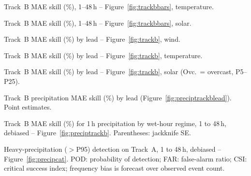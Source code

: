 \documentclass{article}
\newcommand{\numtable}[1]{%
  {\small\setlength{\tabcolsep}{6pt}\renewcommand{\arraystretch}{1.2}#1}%
}
\begin{document}
\begin{table}[htbp]
\centering
\caption{Track~B MAE skill (\%), 1--48\,h -- Figure~\ref{fig:trackbbars},
temperature.}
\label{tab:trackbtemp}
\numtable{}
\end{table}

\begin{table}[htbp]
\centering
\caption{Track~B MAE skill (\%), 1--48\,h -- Figure~\ref{fig:trackbbars},
solar.}
\label{tab:trackbsolar}
\numtable{}
\end{table}

\begin{table}[htbp]
\centering
\caption{Track~B MAE skill (\%) by lead -- Figure~\ref{fig:trackb}, wind.}
\label{tab:trackbleadwind}
\numtable{}
\end{table}

\begin{table}[htbp]
\centering
\caption{Track~B MAE skill (\%) by lead -- Figure~\ref{fig:trackb},
temperature.}
\label{tab:trackbleadtemp}
\numtable{}
\end{table}

\begin{table}[htbp]
\centering
\caption{Track~B MAE skill (\%) by lead -- Figure~\ref{fig:trackb}, solar
(Ovc.\ = overcast, P5--P25).}
\label{tab:trackbleadsolar}
\numtable{}
\end{table}

\begin{table}[htbp]
\centering
\caption{Track~B precipitation MAE skill (\%) by lead
(Figure~\ref{fig:preciptrackblead}). Point estimates.}
\label{tab:preciptrackblead}
\numtable{}
\end{table}

\begin{table}[htbp]
\centering
\caption{Track~B MAE skill (\%) for 1\,h precipitation by wet-hour regime,
1 to 48\,h, debiased -- Figure~\ref{fig:preciptrackb}. Parentheses:
jackknife SE.}
\label{tab:preciptrackb}
\numtable{\resizebox{\textwidth}{!}{}}
\end{table}
\begin{table}[htbp]
\centering
\caption{Heavy-precipitation ($>$P95) detection on Track~A, 1 to 48\,h,
debiased -- Figure~\ref{fig:precipcat}. POD: probability of detection; FAR:
false-alarm ratio; CSI: critical success index; frequency bias is forecast
over observed event count.}
\label{tab:precipcat}
\numtable{}
\end{table}
\end{document}
